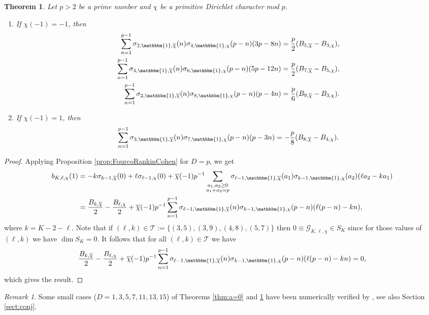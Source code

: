 \documentclass[11pt,letterpaper,reqno]{amsart}
\numberwithin{figure}{section}
\numberwithin{table}{section}
\theoremstyle{definition}
\theoremstyle{plain}
\newtheorem{theorem}{Theorem}[section]
\theoremstyle{definition}
\theoremstyle{definition}
\theoremstyle{remark}
\newtheorem{remark}{Remark}[section]
\numberwithin{equation}{section}
\theoremstyle{remark}
\begin{document}
\begin{theorem}\label{thm:b=0}
    Let $p>2$ be a prime number and  $\chi$ be a primitive Dirichlet character mod $p$.
    \begin{enumerate} 
    \item 
    If $\chi(-1)=-1$, then
    \begin{align*}
        \sum_{n=1}^{p-1}\sigma_{2,\mathbbm{1},\overline{\chi}}(n)\sigma_{4,\mathbbm{1},\chi}(p-n)(3p-8n)&=\frac{p}{2}(B_{5,\overline{\chi}}-B_{3,\chi}),\\ \sum_{n=1}^{p-1}\sigma_{4,\mathbbm{1},\overline{\chi}}(n)\sigma_{6,\mathbbm{1},\chi}(p-n)(5p-12n)&=\frac{p}{2}(B_{7,\overline{\chi}}-B_{5,\chi}),\\\sum_{n=1}^{p-1}\sigma_{2,\mathbbm{1},\overline{\chi}}(n)\sigma_{8,\mathbbm{1},\chi}(p-n)(p-4n)&=\frac{p}{6}(B_{9,\overline{\chi}}-B_{3,\chi}).
 \end{align*}
 \item  If $\chi(-1)=1$, then
 \begin{align}
 \sum_{n=1}^{p-1}\sigma_{3,\mathbbm{1},\overline{\chi}}(n)\sigma_{7,\mathbbm{1},\chi}(p-n)(p-3n)=-\frac{p}{8}(B_{8,\overline{\chi}}-B_{4,\chi}).  \end{align}
 \end{enumerate}
\end{theorem}
\begin{proof}
    Applying Proposition \ref{prop:FourcoRankinCohen} for $D=p$, we get 
    \begin{align*}
        b_{K,\ell,\chi}(1)&=-k\sigma_{k-1,\overline{\chi}}(0)+\ell \sigma_{\ell-1,\chi}(0)+\overline{\chi}(-1)p^{-1}\sum_{\substack{a_1,a_2\geq0\\a_1+a_2=p}}\sigma_{\ell-1,\mathbbm{1},\overline{\chi}}(a_1)\sigma_{k-1,\mathbbm{1},\chi}(a_2)(\ell a_2-k a_1)\\&=\frac{B_{k,\overline{\chi}}}{2}-\frac{B_{\ell,\chi}}{2}+\overline{\chi}(-1)p^{-1}\sum_{n=1}^{p-1}\sigma_{\ell-1,\mathbbm{1},\overline{\chi}}(n)\sigma_{k-1,\mathbbm{1},\chi}(p-n)(\ell (p-n)-kn),
    \end{align*}
where $k=K-2-\ell$. Note that if $(\ell,k)\in \mathcal{T}:=\{(3,5),(3,9),(4,8),(5,7)\}$ then $0\equiv \mathcal{G}_{K,\ell,\chi}\in S_K$ since for those values of $(\ell,k)$ we have $\dim S_K=0$.
It follows that for all $(\ell,k)\in\mathcal{T}$  we have 
    \begin{align*}
        \frac{B_{k,\overline{\chi}}}{2}-\frac{B_{\ell,\chi}}{2}+\overline{\chi}(-1)p^{-1}\sum_{n=1}^{p-1}\sigma_{\ell-1,\mathbbm{1},\overline{\chi}}(n)\sigma_{k-1,\mathbbm{1},\chi}(p-n)(\ell (p-n)-kn)=0,
    \end{align*}
    which gives the result.
\end{proof}
\begin{remark}
  Some small cases  ($D=1,3,5,7,11,13,15$) of Theorems \ref{thm:a=0} and \ref{thm:b=0}  have been numerically verified by \cite{codefortwisted}, see also Section \ref{sect:conj}.  
\end{remark}
\end{document}
